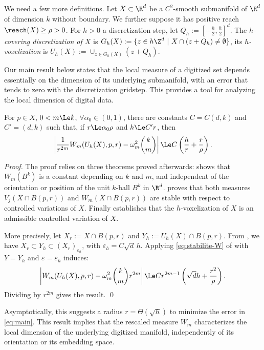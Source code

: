 We need a few more definitions. Let $X \subset \R^d$ be a $C^2$-smooth
submanifold of $\R^d$ of dimension $k$ without boundary. We further
suppose it has positive reach $\reach(X)\geq \rho>0$. For $h>0$ a
discretization step, let $Q_h:= \left[-\frac{h}{2},
  \frac{h}{2}\right]^d$. The \emph{$h$-covering discretization of $X$}
is $G_h(X) := \{ z \in h\Z^d~|~X \cap (z+Q_h) \neq \emptyset \}$, its
\emph{$h$-voxelization} is $U_h(X) := \cup_{z \in G_h(X)} (z + Q_h)$.

Our main result below states that the local measure of a digitized set
depends essentially on the dimension of its underlying submanifold,
with an error that tends to zero with the discretization
gridstep. This provides a tool for analyzing the local dimension of
digital data.
\begin{theorem}
\label{thm:main}
For $p \in X$, $0 < m \Le k$, $\forall \alpha_0 \in (0,1)$, there are constants $C=C(d,k)$ and $C'=(d,k)$ such that, if $r \Le \alpha_0\rho$ and $h \Le C' r$, then
\begin{align}\label{eq:main}
  \left| \frac{1}{r^{2m}}W_m(U_h(X),p,r) - \omega_m^2\binom{k}{m} \right|
  \Le  C \left( \frac{h}{r} + \frac{r}{\rho} \right).
\end{align}
\end{theorem}
\begin{proof}
  The proof relies on three theorems proved afterwards:
   shows that $W_m(B^k)$ is a constant
  depending on $k$ and $m$, and independent of the orientation or
  position of the unit $k$-ball $B^k$ in
  $\R^d$.  proves that both
  measures $V_j(X \cap B(p,r))$ and $W_m(X \cap B(p,r))$ are stable
  with respect to controlled variations of $X$. Finally
   establishes that the
  $h$-voxelization of $X$ is an admissible controlled variation of
  $X$.

  More precisely, let $X_r:= X \cap B(p,r)$ and $Y_h:=U_h(X) \cap
  B(p,r)$. From , we have $X_r
  \subset Y_h \subset (X_r)_{\varepsilon_h}$, with
  $\varepsilon_h=C\sqrt d\,h$. Applying \eqref{eq:stabilite-W} of
   with $Y=Y_h$ and
  $\varepsilon=\varepsilon_h$ induces:
  \begin{equation*}
    \left| W_m(U_h(X),p,r)-\omega_m^2\binom{k}{m}r^{2m} \right|
    \Le C r^{2m-1} \left( \sqrt{d} h+\frac{r^2}{\rho} \right).
  \end{equation*}
  Dividing by $r^{2m}$ gives the result.
  \qed
\end{proof}
Asymptotically, this suggests a radius $r=\Theta(\sqrt{h})$ to
minimize the error in \eqref{eq:main}. This result implies that the
rescaled measure $W_m$ characterizes the local dimension of the
underlying digitized manifold, independently of its orientation or its
embedding space.

